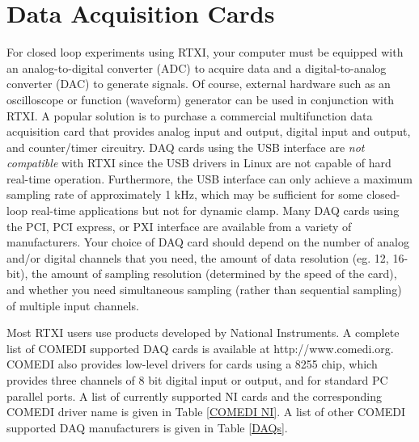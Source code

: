 
\section{Data Acquisition Cards}
\label{dataacquisition}

For closed loop experiments using RTXI, your computer must be equipped with an analog-to-digital converter (ADC) to acquire data and a digital-to-analog converter (DAC) to generate signals. Of course, external hardware such as an oscilloscope or function (waveform) generator can be used in conjunction with RTXI. A popular solution is to purchase a commercial multifunction data acquisition card that provides analog input and output, digital input and output, and counter/timer circuitry. DAQ cards using the USB interface are \attention \emph{not compatible} with RTXI since the USB drivers in Linux are not capable of hard real-time operation. Furthermore, the USB interface can only achieve a maximum sampling rate of approximately 1 kHz, which may be sufficient for some closed-loop real-time applications but not for dynamic clamp. Many DAQ cards using the PCI, PCI express, or PXI interface are available from a variety of manufacturers. Your choice of DAQ card should depend on the number of analog and/or digital channels that you need, the amount of data resolution (eg. 12, 16-bit), the amount of sampling resolution (determined by the speed of the card), and whether you need simultaneous sampling (rather than sequential sampling) of multiple input channels. 

Most RTXI users use products developed by National Instruments. \attention A complete list of COMEDI supported DAQ cards is available at http://www.comedi.org. COMEDI also provides low-level drivers for cards using a 8255 chip, which provides three channels of 8 bit digital input or output, and for standard PC parallel ports. A list of currently supported NI cards and the corresponding COMEDI driver name is given in Table \ref{COMEDI NI}. A list of other COMEDI supported DAQ manufacturers is given in Table \ref{DAQs}.

